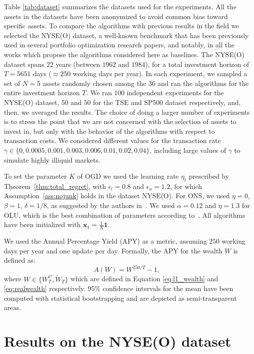 Table \ref{tab:dataset} summarizes the datasets used for the experiments. All the assets in the datasets have been anonymized to avoid common bias toward specific assets.
To compare the algorithms with previous results in the field we selected the NYSE(O) dataset, a well-known benchmark that has been previously used in several portfolio optimization research papers, and notably, in all the works which propose the algorithms considered here as baselines.
The NYSE(O) dataset spans $22$ years (between $1962$ and $1984$), for a total investment horizon of $T = 5651$ days ($\approx250$ working days per year).
In each experiment, we sampled a set of $N=5$ assets randomly chosen among the $36$ and ran the algorithms for the entire investment horizon $T$.
We ran $100$ independent experiments for the NYSE(O) dataset, $50$ and $50$ for the TSE and SP500 dataset respectively, and, then, we averaged the results. The choice of doing a larger number of experiments is to stress the point that we are not concerned with the selection of assets to invest in, but only with the behavior of the algorithms with respect to transaction costs.
We considered different values for the transaction rate $\gamma \in \{ 0, 0.0005, 0.001, 0.003, 0.006, 0.01, 0.02, 0.04 \}$, including large values of $\gamma$ to simulate highly illiquid markets.

To set the parameter $K$ of OGD we used the learning rate $\eta_t$ prescribed by Theorem~\ref{thm:total_regret}, with $\epsilon_l = 0.8$ and $\epsilon_u = 1.2$, for which Assumption~\ref{ass:nojunk} holds in the dataset NYSE(O).
For ONS, we used $\eta = 0$, $\beta = 1$, $\delta = 1/8$, as suggested by the authors in~\cite{agarwal2006algorithms}.
We used $\alpha = 0.12$ and $\eta = 1.3$ for OLU, which is the best combination of parameters according to~\cite{das2013online}.
All algorithms have been initialized with $\mathbf{x}_1 = \frac{1}{N} \mathbf{1}$.

We used the Annual Percentage Yield (APY) as a metric, assuming $250$ working days per year and one update per day.
Formally, the APY for the wealth $W$ is defined as:
\begin{equation*}
    A(W) = W^{250/T} - 1,
\end{equation*}
where $W \in \{ W_T^C, \tilde W_T \}$ which are defined in Equation \eqref{eq:l1_wealth} and \eqref{eq:realwealth} respectively.
$95\%$ confidence intervals for the mean have been computed with statistical bootstrapping and are depicted as semi-transparent areas.

\section{Results on the NYSE(O) dataset}

